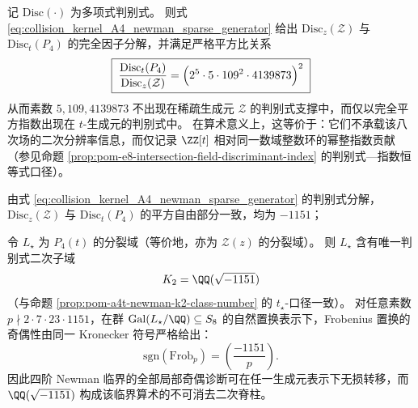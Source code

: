 

\begin{conclusion}\label{con:pom-a4-newman-discriminant-index-artifact}
记 \(\mathrm{Disc}(\cdot)\) 为多项式判别式。
则式 \eqref{eq:collision_kernel_A4_newman_sparse_generator} 给出 \(\mathrm{Disc}_z(\mathcal Z)\) 与 \(\mathrm{Disc}_t(P_4)\) 的完全因子分解，并满足严格平方比关系
\[
\boxed{\;
\frac{\mathrm{Disc}_t(P_4)}{\mathrm{Disc}_z(\mathcal Z)}
=\Bigl(2^{5}\cdot 5\cdot 109^{2}\cdot 4139873\Bigr)^2\;}
\]
从而素数 \(5,109,4139873\) 不出现在稀疏生成元 \(\mathcal Z\) 的判别式支撑中，而仅以完全平方指数出现在 \(t\)-生成元的判别式中。
在算术意义上，这等价于：它们不承载该八次场的二次分辨率信息，而仅记录 \(\ZZ[t]\) 相对同一数域整数环的幂整指数贡献（参见命题 \ref{prop:pom-e8-intersection-field-discriminant-index} 的判别式—指数恒等式口径）。
\end{conclusion}

\begin{conclusion}\label{con:pom-a4-newman-common-quadratic-spine}
由式 \eqref{eq:collision_kernel_A4_newman_sparse_generator} 的判别式分解，\(\mathrm{Disc}_z(\mathcal Z)\) 与 \(\mathrm{Disc}_t(P_4)\) 的平方自由部分一致，均为 \(-1151\)；
\par
令 \(L_\star\) 为 \(P_4(t)\) 的分裂域（等价地，亦为 \(\mathcal Z(z)\) 的分裂域）。
则 \(L_\star\) 含有唯一判别式二次子域
\[
K_2=\QQ(\sqrt{-1151})
\]
（与命题 \ref{prop:pom-a4t-newman-k2-class-number} 的 \(t_\star\)-口径一致）。
对任意素数 \(p\nmid 2\cdot 7\cdot 23\cdot 1151\)，在群 \(\mathrm{Gal}(L_\star/\QQ)\subseteq S_8\) 的自然置换表示下，Frobenius 置换的奇偶性由同一 Kronecker 符号严格给出：
\[
\mathrm{sgn}(\mathrm{Frob}_p)=\left(\frac{-1151}{p}\right).
\]
因此四阶 Newman 临界的全部局部奇偶诊断可在任一生成元表示下无损转移，而 \(\QQ(\sqrt{-1151})\) 构成该临界算术的不可消去二次脊柱。
\end{conclusion}

